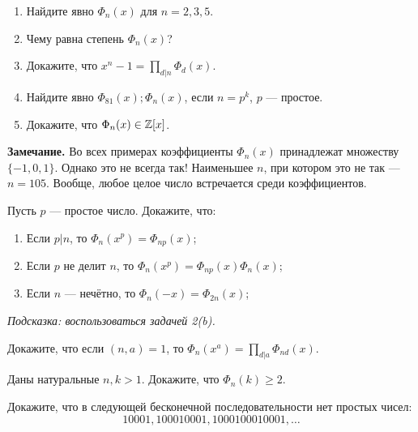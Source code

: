 \documentclass{article}
\begin{document}
    \begin{enumerate_boxed}
        \setcounter{enumi}{1}
        \item
        \begin{enumerate}
            \item  Найдите явно $\Phi_n(x)$ для $n = 2,3,5$.

            \item  Чему равна степень $\Phi_n(x)$?

            \item  Докажите, что $x^n - 1 = \prod\limits_{d|n} \Phi_d(x)$.

            \item  Найдите явно $\Phi_{81}(x); \Phi_n(x)$, если $n = p^k$, $p$ --- простое.

            \item  Докажите, что $\Phi_n(x) \in \mathbb{Z}[x]$.
        \end{enumerate}


        \textbf{Замечание.} Во всех примерах коэффициенты $\Phi_n(x)$ принадлежат множеству \\ $\{-1,0,1\}$.
        Однако это не всегда так!
        Наименьшее $n$, при котором это не так --- $n = 105$.
        Вообще, любое целое число встречается среди коэффициентов.

        \item Пусть $p$ --- простое число.
        Докажите, что:
        \begin{enumerate}
            \item  Если $p|n$, то $\Phi_n(x^p) = \Phi_{np}(x)$;
            \item  Если $p$ не делит $n$, то $\Phi_n(x^p) = \Phi_{np}(x)\Phi_n(x)$;
            \item  Если $n$ --- нечётно, то $\Phi_n(-x) = \Phi_{2n}(x)$;

        \end{enumerate}

        \textit{Подсказка: воспользоваться задачей 2(b).}

        \item Докажите, что если $(n,a) = 1$, то $\Phi_n(x^a) = \prod\limits_{d|a}\Phi_{nd}(x)$.

        \item Даны натуральные $n,k > 1$.
        Докажите, что $\Phi_n(k) \geq 2$.

        \item Докажите, что в следующей бесконечной последовательности нет простых чисел:
        \[10001, 100010001, 1000100010001, \ldots \]


\end{enumerate_boxed}
\end{document}
